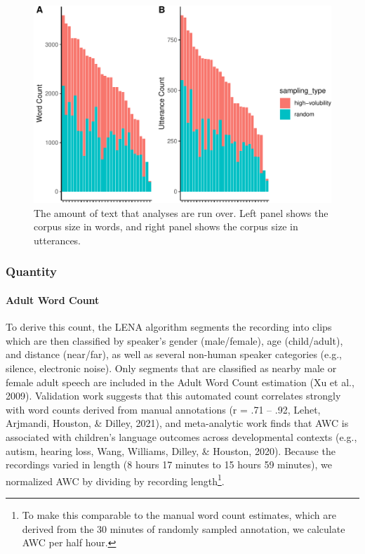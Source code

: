 \documentclass[
  man]{apa6}
\let\oldparagraph\paragraph
\renewcommand{\paragraph}[1]{\oldparagraph{#1}\mbox{}}
\begin{document}
\begin{figure}
\centering
\includegraphics{input_quality_manuscript_files/figure-latex/corpus-size-plot-1.pdf}
\caption{\label{fig:corpus-size-plot}The amount of text that analyses are run over. Left panel shows the corpus size in words, and right panel shows the corpus size in utterances.}
\end{figure}

\hypertarget{quantity}{%
\subsubsection{Quantity}\label{quantity}}

\hypertarget{adult-word-count}{%
\paragraph{Adult Word Count}\label{adult-word-count}}

To derive this count, the LENA algorithm segments the recording into clips which are then classified by speaker's gender (male/female), age (child/adult), and distance (near/far), as well as several non-human speaker categories (e.g., silence, electronic noise). Only segments that are classified as nearby male or female adult speech are included in the Adult Word Count estimation (Xu et al., 2009). Validation work suggests that this automated count correlates strongly with word counts derived from manual annotations (r = .71 -- .92, Lehet, Arjmandi, Houston, \& Dilley, 2021), and meta-analytic work finds that AWC is associated with children's language outcomes across developmental contexts (e.g., autism, hearing loss, Wang, Williams, Dilley, \& Houston, 2020). Because the recordings varied in length (8 hours 17 minutes to 15 hours 59 minutes), we normalized AWC by dividing by recording length\footnote{To make this comparable to the manual word count estimates, which are derived from the 30 minutes of randomly sampled annotation, we calculate AWC per half hour.}.
\end{document}
